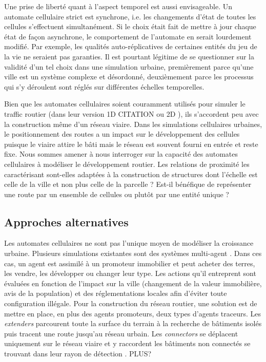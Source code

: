 \documentclass[10pt]{article}
\begin{document}
Une prise de liberté quant à l'aspect temporel est aussi
envisageable. Un automate cellulaire strict est synchrone, i.e. les
changements d'état de toutes les cellules s'effectuent
simultanément. Si le choix était fait de mettre à jour chaque état de
façon asynchrone, le comportement de l'automate en serait lourdement
modifié. Par exemple, les qualités auto-réplicatives de certaines
entités du jeu de la vie ne seraient pas garanties. Il est pourtant
légitime de se questionner sur la validité d'un tel choix dans une
simulation urbaine, premièrement parce qu'une ville est un système
complexe et désordonné, deuxièmement parce les processus qui s'y
déroulent sont réglés sur différentes échelles temporelles.

Bien que les automates cellulaires soient couramment utilisés pour
simuler le traffic routier (dans leur version 1D CITATION ou 2D
\cite{Queloz1996}), ils s'accordent peu avec la construction même d'un
réseau viaire. Dans les simulations cellulaires urbaines, le
positionnement des routes a un impact sur le développement des
cellules puisque le viaire attire le bâti mais le réseau est souvent
fourni en entrée et reste fixe. Nous sommes amener à nous interroger
sur la capacité des automates cellulaires à modéliser le développement
routier. Les relations de proximité les caractérisant sont-elles
adaptées à la construction de structures dont l'échelle est celle de
la ville et non plus celle de la parcelle ? Est-il bénéfique de
représenter une route par un ensemble de cellules ou plutôt par une
entité unique ?

\subsection{Approches alternatives}

Les automates cellulaires ne sont pas l'unique moyen de modéliser la
croissance urbaine. Plusieurs simulations existantes sont des systèmes
multi-agent \cite{Lechnera,Lechner2004}. Dans ces cas, un agent est
assimilé à un promoteur immobilier et peut acheter des terres, les
vendre, les développer ou changer leur type. Les actions qu'il
entreprent sont évaluées en fonction de l'impact sur la ville
(changement de la valeur immobilière, avis de la population) et des
réglementations locales afin d'éviter toute configuration illégale.
Pour la construction du réseau routier, une solution est de mettre en
place, en plus des agents promoteurs, deux types d'agents
traceurs. Les \textit{extenders} parcourent toute la surface du
terrain à la recherche de bâtiments isolés puis tracent une route
jusqu'au réseau urbain. Les \textit{connectors} se déplacent
uniquement sur le réseau viaire et y raccordent les bâtiments non
connectés se trouvant dans leur rayon de détection
\cite{Lechnera}. PLUS?
\end{document}
